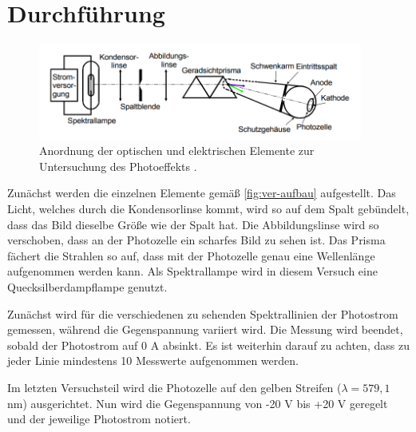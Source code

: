 \section{Durchführung}
\label{sec:Durchführung}

\begin{figure}
  \centering
  \includegraphics[width=0.95\textwidth]{content/ver-aufbau.png}
  \caption{Anordnung der optischen und elektrischen Elemente zur Untersuchung des Photoeffekts \cite{V500}.}
  \label{fig:ver-aufbau}
\end{figure}

Zunächst werden die einzelnen Elemente gemäß \autoref{fig:ver-aufbau} aufgestellt.
Das Licht, welches durch die Kondensorlinse kommt, wird so auf dem Spalt gebündelt, dass das Bild dieselbe Größe wie der Spalt hat.
Die Abbildungslinse wird so verschoben, dass an der Photozelle ein scharfes Bild zu sehen ist.
Das Prisma fächert die Strahlen so auf, dass mit der Photozelle genau eine Wellenlänge aufgenommen werden kann.
Als Spektrallampe wird in diesem Versuch eine Quecksilberdampflampe genutzt.

Zunächst wird für die verschiedenen zu sehenden Spektrallinien der Photostrom gemessen,
während die Gegenspannung variiert wird. Die Messung wird beendet, sobald der Photostrom auf 0 A absinkt.
Es ist weiterhin darauf zu achten, dass zu jeder Linie mindestens 10 Messwerte aufgenommen werden.

Im letzten Versuchsteil wird die Photozelle auf den gelben Streifen ($\lambda = 579,1$ nm) ausgerichtet.
Nun wird die Gegenspannung von -20 V bis +20 V geregelt und der jeweilige Photostrom notiert.
